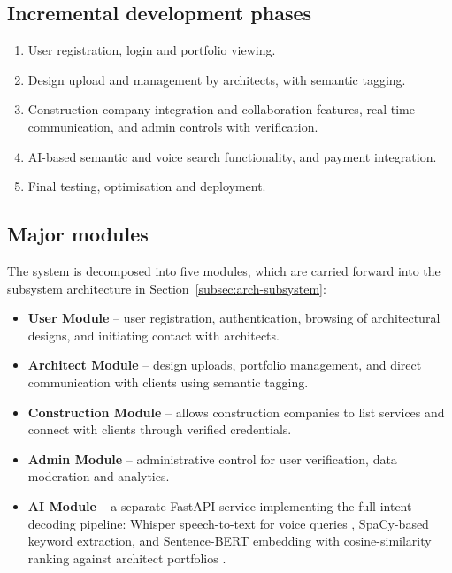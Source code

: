 \subsection{Incremental development phases}
\label{subsec:increments}

\begin{enumerate}[label=\textbf{Increment \arabic*:}, itemsep=2pt,
                  labelwidth=2.8cm, labelsep=0.4em, align=left,
                  leftmargin=3.2cm]
  \item User registration, login and portfolio viewing.
  \item Design upload and management by architects, with semantic
        tagging.
  \item Construction company integration and collaboration features,
        real-time communication, and admin controls with verification.
  \item AI-based semantic and voice search functionality, and payment
        integration.
  \item Final testing, optimisation and deployment.
\end{enumerate}

\subsection{Major modules}
\label{subsec:major-modules}

The system is decomposed into five modules, which are carried forward
into the subsystem architecture in Section~\ref{subsec:arch-subsystem}:

\begin{itemize}[leftmargin=*, itemsep=2pt]
  \item \textbf{User Module} -- user registration, authentication,
        browsing of architectural designs, and initiating contact with
        architects.
  \item \textbf{Architect Module} -- design uploads, portfolio
        management, and direct communication with clients using semantic
        tagging.
  \item \textbf{Construction Module} -- allows construction companies to
        list services and connect with clients through verified
        credentials.
  \item \textbf{Admin Module} -- administrative control for user
        verification, data moderation and analytics.
  \item \textbf{AI Module} -- a separate FastAPI service implementing
        the full intent-decoding pipeline: Whisper speech-to-text for
        voice queries \cite{radford2022whisper}, SpaCy-based keyword
        extraction, and Sentence-BERT embedding with cosine-similarity
        ranking against architect portfolios
        \cite{reimers2019sbert}.
\end{itemize}

